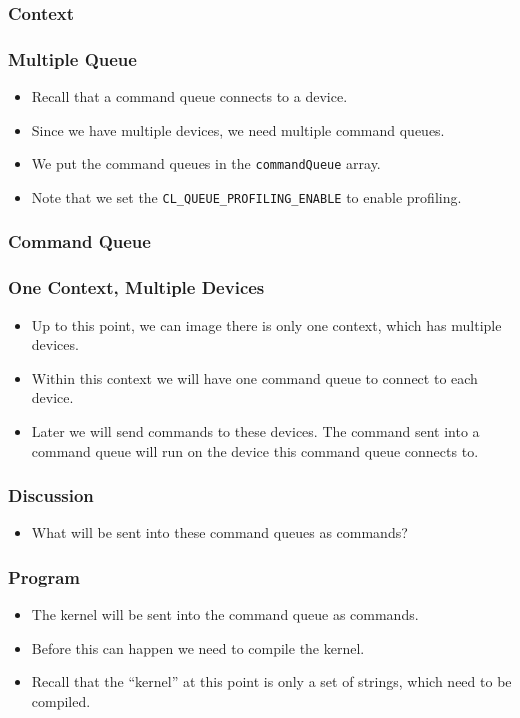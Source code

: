 \documentclass{beamer}
\begin{document}
\begin{frame}
  \frametitle{Context}
\end{frame}

\begin{frame}
  \frametitle{Multiple Queue}
  \begin{itemize}
    \item Recall that a command queue connects to a device.  
    \item Since we have multiple devices, we need multiple
      command queues.
    \item We put the command queues in the {\tt commandQueue} array.
    \item Note that we set the {\tt CL\_QUEUE\_PROFILING\_ENABLE} to
      enable profiling.
  \end{itemize}
\end{frame}

\begin{frame}
  \frametitle{Command Queue}
\end{frame}

\begin{frame}
  \frametitle{One Context, Multiple Devices}
  \begin{itemize}
    \item Up to this point, we can image there is only one context,
      which has multiple devices.
    \item Within this context we will have one command queue to connect
      to each device.
    \item Later we will send commands to these devices.  The command
      sent into a command queue will run on the device this command
      queue connects to.
  \end{itemize}
\end{frame}

\begin{frame}
  \frametitle{Discussion}
  \begin{itemize}
    \item What will be sent into these command queues as commands?
  \end{itemize}
\end{frame}

\begin{frame}
  \frametitle{Program}
  \begin{itemize}
    \item The kernel will be sent into the command queue as commands.
    \item Before this can happen we need to compile the kernel.
    \item Recall that the ``kernel'' at this point is only a set
      of strings, which need to be compiled.
  \end{itemize}
\end{frame}
\end{document}
